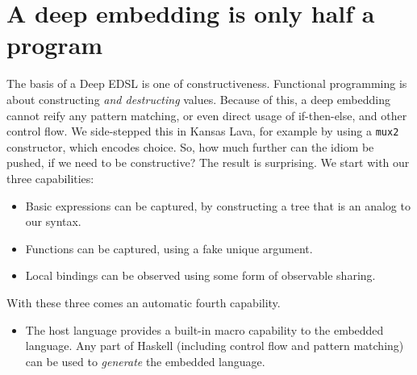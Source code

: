 \documentclass[11pt]{article}
\begin{document}
\section{A deep embedding is only half a program}

The basis of a Deep EDSL is one of constructiveness.
Functional programming is about constructing {\em and destructing\/} values.
Because of this, a deep embedding cannot reify any pattern matching, 
or even direct usage of if-then-else, and other control flow. We side-stepped this
in Kansas Lava, for example by using a \verb|mux2| constructor, 
which encodes choice.
So, how much further can the idiom be pushed, if we need to be constructive?
The result is surprising. We start with our three capabilities:
\begin{itemize}
\item Basic expressions can be captured, by constructing a tree that is an analog to our syntax.
\item Functions can be captured, using a fake unique argument.
\item Local bindings can be observed using some form of observable sharing.
\end{itemize}
With these three comes an automatic fourth capability.
\begin{itemize}
\item The host language provides a built-in macro capability to the embedded language.
Any part of Haskell (including control flow and pattern matching) can be used
to {\em generate\/} the embedded language. 
\end{itemize}
\end{document}
